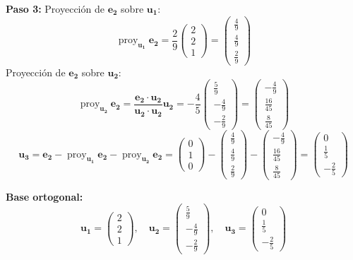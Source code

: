 \begin{prob}
\begin{myproof}
\textbf{Paso 3:}  
Proyección de $\mathbf{e_2}$ sobre $\mathbf{u_1}$:
\[
\operatorname{proy}_{\mathbf{u_1}} \mathbf{e_2} = \frac{2}{9} \begin{pmatrix} 2 \\ 2 \\ 1 \end{pmatrix} = \begin{pmatrix} \frac{4}{9} \\ \frac{4}{9} \\ \frac{2}{9} \end{pmatrix}
\]
Proyección de $\mathbf{e_2}$ sobre $\mathbf{u_2}$:
\[
\operatorname{proy}_{\mathbf{u_2}} \mathbf{e_2} = \frac{\mathbf{e_2} \cdot \mathbf{u_2}}{\mathbf{u_2} \cdot \mathbf{u_2}} \mathbf{u_2} = -\frac{4}{5} \begin{pmatrix} \frac{5}{9} \\ -\frac{4}{9} \\ -\frac{2}{9} \end{pmatrix} = \begin{pmatrix} -\frac{4}{9} \\ \frac{16}{45} \\ \frac{8}{45} \end{pmatrix}
\]
\[
\mathbf{u_3} = \mathbf{e_2} - \operatorname{proy}_{\mathbf{u_1}} \mathbf{e_2} - \operatorname{proy}_{\mathbf{u_2}} \mathbf{e_2} = \begin{pmatrix} 0 \\ 1 \\ 0 \end{pmatrix} - \begin{pmatrix} \frac{4}{9} \\ \frac{4}{9} \\ \frac{2}{9} \end{pmatrix} - \begin{pmatrix} -\frac{4}{9} \\ \frac{16}{45} \\ \frac{8}{45} \end{pmatrix} = \begin{pmatrix} 0 \\ \frac{1}{5} \\ -\frac{2}{5} \end{pmatrix}
\]

\textbf{Base ortogonal:}
\[
\boxed{\mathbf{u_1} = \begin{pmatrix} 2 \\ 2 \\ 1 \end{pmatrix}, \quad \mathbf{u_2} = \begin{pmatrix} \frac{5}{9} \\ -\frac{4}{9} \\ -\frac{2}{9} \end{pmatrix}, \quad \mathbf{u_3} = \begin{pmatrix} 0 \\ \frac{1}{5} \\ -\frac{2}{5} \end{pmatrix}}
\]
\end{myproof}
\end{prob}


